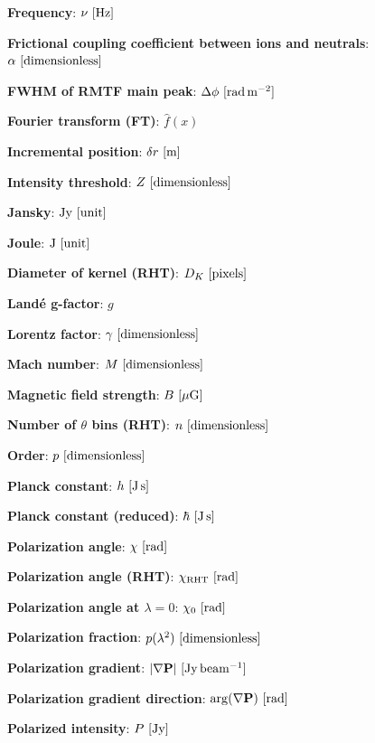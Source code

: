 \documentclass[a4paper,11pt]{article}
\begin{document}
{\noindent}\textbf{Frequency}: $\nu~[{\rm Hz}]$

{\noindent}\textbf{Frictional coupling coefficient between ions and neutrals}: $\alpha~[{\rm dimensionless}]$

{\noindent}\textbf{FWHM of RMTF main peak}: $\Delta\phi~[{\rm rad\,m^{-2}}]$

{\noindent}\textbf{Fourier transform (FT)}: $\hat{f}(x)$

{\noindent}\textbf{Incremental position}: $\delta r~[{\rm m}]$

{\noindent}\textbf{Intensity threshold}: $Z ~ [{\rm dimensionless}]$

{\noindent}\textbf{Jansky}: $\mathrm{Jy} ~ [\rm unit]$

{\noindent}\textbf{Joule}: $\mathrm{J} ~ [\rm unit]$

{\noindent}\textbf{Diameter of kernel (RHT)}: $D_K ~ [{\rm pixels}]$

{\noindent}\textbf{Land\'e g-factor}: $g$

{\noindent}\textbf{Lorentz factor}: $\gamma ~ [\rm dimensionless]$

{\noindent}\textbf{Mach number}: $M~[{\rm dimensionless]}$

{\noindent}\textbf{Magnetic field strength}: $B~[{\rm \mu G]}$

{\noindent}\textbf{Number of $\theta$ bins (RHT)}: $n ~ [{\rm dimensionless}]$

{\noindent}\textbf{Order}: $p~[{\rm dimensionless}]$

{\noindent}\textbf{Planck constant}: $h~[{\rm J\,s}]$

{\noindent}\textbf{Planck constant (reduced)}: $\hbar~[{\rm J\,s}]$

{\noindent}\textbf{Polarization angle}: $\chi~[{\rm rad}]$

{\noindent}\textbf{Polarization angle (RHT)}: $\chi_\mathrm{RHT} ~ [{\rm rad}]$

{\noindent}\textbf{Polarization angle at $\lambda=0$}: $\chi_0~[{\rm rad}]$

{\noindent}\textbf{Polarization fraction}: $p(\lambda^2)~[{\rm dimensionless}]$

{\noindent}\textbf{Polarization gradient}: $\lvert\nabla \mathbf{P}\rvert ~ [\rm Jy\,beam^{-1}]$

{\noindent}\textbf{Polarization gradient direction}: $\mathrm{arg}(\nabla\mathbf{P}) ~ [\rm rad]$

{\noindent}\textbf{Polarized intensity}: $P ~ [\rm Jy]$
\end{document}
